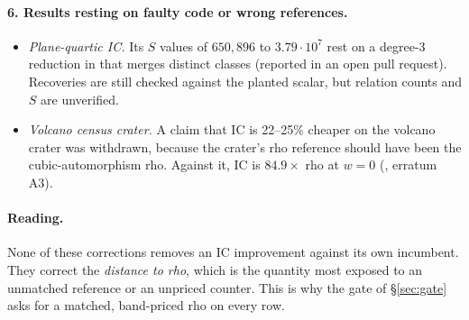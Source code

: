 \paragraph{6. Results resting on faulty code or wrong references.}
\begin{itemize}
\item \emph{Plane-quartic IC.} Its $S$ values of $650{,}896$ to
  $3.79\cdot10^7$ rest on a degree-3 reduction in
   that merges
  distinct classes (reported in an open pull request). Recoveries are still
  checked against the planted scalar, but relation counts and $S$ are
  unverified.
\item \emph{Volcano census crater.} A claim that IC is 22--25\% cheaper on
  the volcano crater was withdrawn, because the crater's rho reference
  should have been the cubic-automorphism rho. Against it, IC is
  $84.9\times$ rho at $w=0$
  (, erratum A3).
\end{itemize}

\paragraph{Reading.} None of these corrections removes an IC improvement
against its own incumbent. They correct the \emph{distance to rho}, which
is the quantity most exposed to an unmatched reference or an unpriced
counter. This is why the gate of \S\ref{sec:gate} asks for a matched,
band-priced rho on every row.
